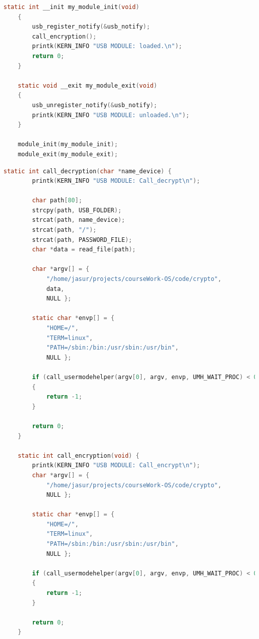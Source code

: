 \documentclass[a4paper, 10pt]{article}
\begin{document}
\begin{lstlisting}[language=C,caption = Загрузка и удаление модуля ядра, label =  lst:module]
	static int __init my_module_init(void)
	{
		usb_register_notify(&usb_notify);
		call_encryption();
		printk(KERN_INFO "USB MODULE: loaded.\n");
		return 0;
	}
	
	static void __exit my_module_exit(void)
	{
		usb_unregister_notify(&usb_notify);    
		printk(KERN_INFO "USB MODULE: unloaded.\n");
	}
	
	module_init(my_module_init);
	module_exit(my_module_exit);
\end{lstlisting}






\begin{lstlisting}[language=C,caption = Функции вызывающие исполняемый файл пользовательского пространства, label =  lst:user_call]
	static int call_decryption(char *name_device) {
		printk(KERN_INFO "USB MODULE: Call_decrypt\n");
		
		char path[80];
		strcpy(path, USB_FOLDER);
		strcat(path, name_device);
		strcat(path, "/");
		strcat(path, PASSWORD_FILE);
		char *data = read_file(path);
		
		char *argv[] = {
			"/home/jasur/projects/courseWork-OS/code/crypto",
			data,
			NULL };
		
		static char *envp[] = {
			"HOME=/",
			"TERM=linux",
			"PATH=/sbin:/bin:/usr/sbin:/usr/bin", 
			NULL };
		
		if (call_usermodehelper(argv[0], argv, envp, UMH_WAIT_PROC) < 0) 
		{
			return -1;
		}
		
		return 0;
	}
	
	static int call_encryption(void) {
		printk(KERN_INFO "USB MODULE: Call_encrypt\n");
		char *argv[] = {
			"/home/jasur/projects/courseWork-OS/code/crypto",
			NULL };
		
		static char *envp[] = {
			"HOME=/",
			"TERM=linux",
			"PATH=/sbin:/bin:/usr/sbin:/usr/bin", 
			NULL };
		
		if (call_usermodehelper(argv[0], argv, envp, UMH_WAIT_PROC) < 0) 
		{
			return -1;
		}
		
		return 0;
	}
\end{lstlisting}
\end{document}
